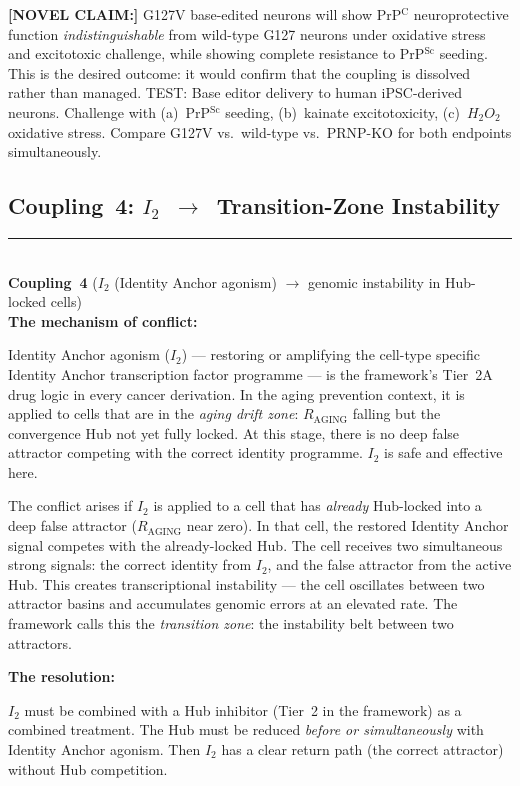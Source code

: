\documentclass[12pt,a4paper]{article}
\newcommand{\raging}{$R_{\mathrm{AGING}}$}
\newcommand{\prpsc}{PrP$^{\mathrm{Sc}}$}
\newcommand{\novel}[1]{\noindent\colorbox{yellow!18}{\parbox{\dimexpr\linewidth-2\fboxsep}{%
  \textbf{[NOVEL CLAIM:]} #1}}\vspace{0.4em}}
\newcommand{\Inet}[1]{$I_{#1}$}
\newcommand{\coupling}[2]{\medskip\noindent\rule{\linewidth}{0.4pt}\\
  \textbf{Coupling~#1} (#2)\\[0.3em]}
\begin{document}
\novel{G127V base-edited neurons will show PrP$^{\mathrm{C}}$ neuroprotective
function \textit{indistinguishable} from wild-type G127 neurons under
oxidative stress and excitotoxic challenge, while showing complete resistance
to \prpsc{} seeding. This is the desired outcome: it would confirm that the
coupling is dissolved rather than managed. TEST: Base editor delivery to
human iPSC-derived neurons. Challenge with (a)~\prpsc{} seeding, (b)~kainate
excitotoxicity, (c)~$H_2O_2$ oxidative stress. Compare G127V vs.\ wild-type
vs.\ PRNP-KO for both endpoints simultaneously.}

\subsection{Coupling~4: \texorpdfstring{\Inet{2}~$\to$~Transition-Zone Instability}{I2 -> Transition-Zone Instability}}

\coupling{4}{\Inet{2} (Identity Anchor agonism) $\to$ genomic
instability in Hub-locked cells}

\textbf{The mechanism of conflict:}

Identity Anchor agonism (\Inet{2}) --- restoring or amplifying the cell-type
specific Identity Anchor transcription factor programme --- is the framework's
Tier~2A drug logic in every cancer derivation. In the aging prevention context,
it is applied to cells that are in the \textit{aging drift zone}: \raging{}
falling but the convergence Hub not yet fully locked. At this stage, there is
no deep false attractor competing with the correct identity programme. \Inet{2}
is safe and effective here.

The conflict arises if \Inet{2} is applied to a cell that has \textit{already}
Hub-locked into a deep false attractor (\raging{} near zero). In that cell,
the restored Identity Anchor signal competes with the already-locked Hub. The
cell receives two simultaneous strong signals: the correct identity from
\Inet{2}, and the false attractor from the active Hub. This creates
transcriptional instability --- the cell oscillates between two attractor
basins and accumulates genomic errors at an elevated rate. The framework calls
this the \textit{transition zone}: the instability belt between two attractors.

\textbf{The resolution:}

\Inet{2} must be combined with a Hub inhibitor (Tier~2 in the framework) as
a combined treatment. The Hub must be reduced \textit{before or simultaneously}
with Identity Anchor agonism. Then \Inet{2} has a clear return path (the
correct attractor) without Hub competition.
\end{document}
